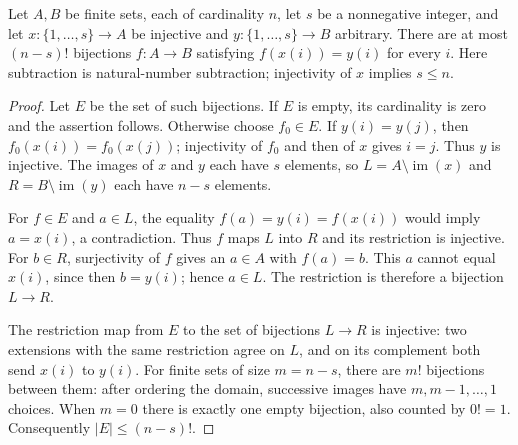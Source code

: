 \begin{helper}
Let $A,B$ be finite sets, each of cardinality $n$, let $s$ be a nonnegative integer,
and let $x:\{1,\ldots,s\}\to A$ be injective and $y:\{1,\ldots,s\}\to B$ arbitrary.
There are at most $(n-s)!$ bijections $f:A\to B$ satisfying $f(x(i))=y(i)$ for every $i$.
Here subtraction is natural-number subtraction; injectivity of $x$ implies $s\leq n$.
\end{helper}
\begin{proof}
Let $E$ be the set of such bijections. If $E$ is empty, its cardinality is zero
and the assertion follows. Otherwise choose $f_0\in E$. If $y(i)=y(j)$,
then $f_0(x(i))=f_0(x(j))$; injectivity of $f_0$ and then of $x$ gives $i=j$.
Thus $y$ is injective. The images of $x$ and $y$ each have $s$ elements,
so $L=A\setminus\operatorname{im}(x)$ and $R=B\setminus\operatorname{im}(y)$
each have $n-s$ elements.

For $f\in E$ and $a\in L$, the equality $f(a)=y(i)=f(x(i))$ would imply
$a=x(i)$, a contradiction. Thus $f$ maps $L$ into $R$ and its restriction
is injective. For $b\in R$, surjectivity of $f$ gives an $a\in A$ with
$f(a)=b$. This $a$ cannot equal $x(i)$, since then $b=y(i)$; hence $a\in L$.
The restriction is therefore a bijection $L\to R$.

The restriction map from $E$ to the set of bijections $L\to R$ is injective:
two extensions with the same restriction agree on $L$, and on its complement
both send $x(i)$ to $y(i)$. For finite sets of size $m=n-s$, there are $m!$
bijections between them: after ordering the domain, successive images have
$m,m-1,\ldots,1$ choices. When $m=0$ there is exactly one empty bijection,
also counted by $0!=1$. Consequently $|E|\leq(n-s)!$.
\end{proof}

